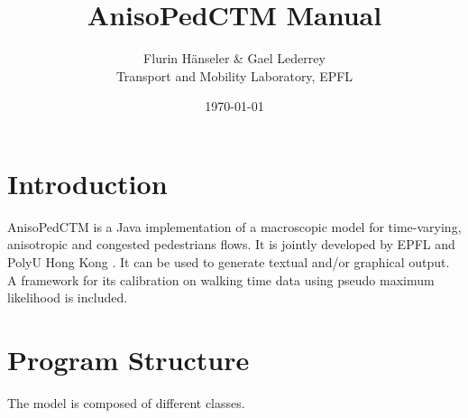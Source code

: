 \documentclass[a4paper,12pt]{article}
\begin{document}
\title{AnisoPedCTM Manual}
\author{Flurin H\"anseler \& Gael Lederrey \\ Transport and Mobility Laboratory, EPFL}

\date{\today}
\maketitle

\section{Introduction}

AnisoPedCTM is a Java implementation of a macroscopic model for  time-varying, anisotropic and congested pedestrians flows. It is jointly developed by EPFL and PolyU Hong Kong \citep{heart2015}. It can be used to generate textual and/or graphical output. A framework for its calibration on walking time data using pseudo maximum likelihood is included.

\section{Program Structure}

The model is composed of different classes. 

\renewcommand\labelitemi{{\boldmath$\cdot$}}
\end{document}
